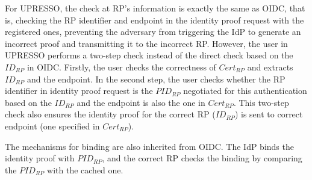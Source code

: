 For UPRESSO, the check at RP's information is exactly the same as OIDC, that is, checking the RP identifier and endpoint in the identity proof request with the registered ones, preventing the adversary from triggering the IdP to generate an incorrect proof and transmitting it to the incorrect RP. However, the user in UPRESSO performs a two-step check instead of the direct check based on the $ID_{RP}$ in OIDC. Firstly, the user checks the correctness of $Cert_{RP}$ and extracts  $ID_{RP}$ and the endpoint. In the second step, the user checks whether the RP identifier in identity proof request is the $PID_{RP}$ negotiated for this authentication based on the $ID_{RP}$ and the endpoint is also the one in $Cert_{RP}$. This two-step check also ensures the identity proof for the correct RP ($ID_{RP}$) is sent to correct endpoint (one specified in $Cert_{RP}$).

The mechanisms for binding are also inherited from OIDC. The IdP binds the identity proof with $PID_{RP}$, and the correct RP checks the binding by comparing the $PID_{RP}$ with the cached one.

